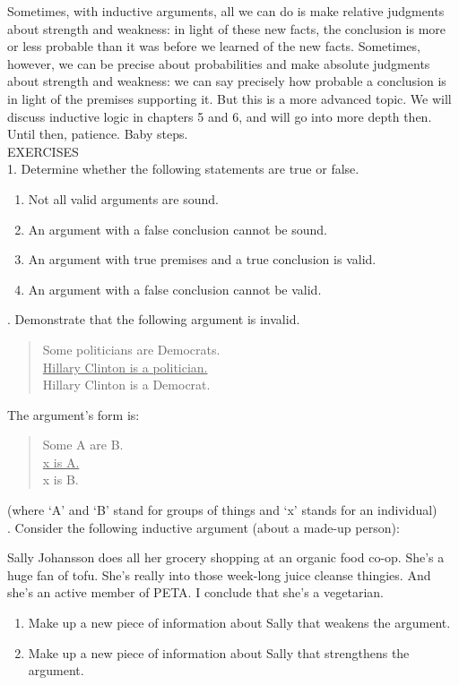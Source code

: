 Sometimes, with inductive arguments, all we can do is make relative judgments about strength
and weakness: in light of these new facts, the conclusion is more or less probable than it was before
we learned of the new facts. Sometimes, however, we can be precise about probabilities and make
absolute judgments about strength and weakness: we can say precisely how probable a conclusion
is in light of the premises supporting it. But this is a more advanced topic. We will discuss inductive
logic in chapters 5 and 6, and will go into more depth then. Until then, patience. Baby steps. \\

EXERCISES \\

1. Determine whether the following statements are true or false.

\begin{enumerate}
\item Not all valid arguments are sound.
\item An argument with a false conclusion cannot be sound.
\item An argument with true premises and a true conclusion is valid.
\item An argument with a false conclusion cannot be valid.
\end{enumerate}

. Demonstrate that the following argument is invalid.

\begin{quote}
Some politicians are Democrats. \\
\underline{Hillary Clinton is a politician.} \\
Hillary Clinton is a Democrat. \\
\end{quote}

The argument's form is:

\begin{quote}
Some A are B. \\
\underline{x is A.} \\
x is B. \\
\end{quote}

(where `A' and `B' stand for groups of things and `x' stands for an individual) \\


. Consider the following inductive argument (about a made-up person):

\noindent
Sally Johansson does all her grocery shopping at an organic food co-op. She's a huge fan
of tofu. She's really into those week-long juice cleanse thingies. And she's an active
member of PETA. I conclude that she's a vegetarian.

\begin{enumerate}
\item Make up a new piece of information about Sally that weakens the argument.
\item Make up a new piece of information about Sally that strengthens the argument.
\end{enumerate}


